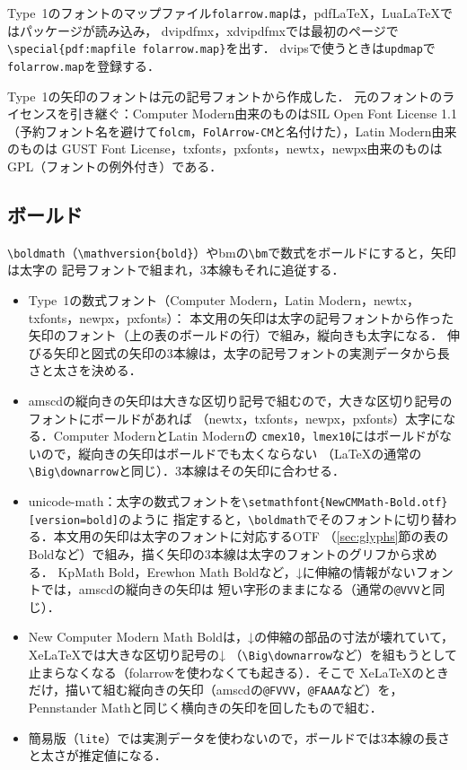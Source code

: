 \documentclass[dvipdfmx,paper=a4]{jlreq}
\newcommand\pkg[1]{\textsf{#1}}
\newcommand\file[1]{\texttt{#1}}
\begin{document}
Type~1のフォントのマップファイル\file{folarrow.map}は，pdf\LaTeX，Lua\LaTeX{}ではパッケージが読み込み，
dvipdfmx，xdvipdfmxでは最初のページで\verb|\special{pdf:mapfile folarrow.map}|を出す．
dvipsで使うときは\file{updmap}で\file{folarrow.map}を登録する．

Type~1の矢印のフォントは元の記号フォントから作成した．
元のフォントのライセンスを引き継ぐ：Computer Modern由来のものはSIL Open Font License 1.1
（予約フォント名を避けて\file{folcm}，\texttt{FolArrow-CM}と名付けた），Latin Modern由来のものは
GUST Font License，\pkg{txfonts}，\pkg{pxfonts}，\pkg{newtx}，\pkg{newpx}由来のものは
GPL（フォントの例外付き）である．

\subsection{ボールド}\label{sec:bold}
\verb|\boldmath|（\verb|\mathversion{bold}|）や\pkg{bm}の\verb|\bm|で数式をボールドにすると，矢印は太字の
記号フォントで組まれ，3本線もそれに追従する．
\begin{itemize}
\item Type~1の数式フォント（Computer Modern，Latin Modern，\pkg{newtx}，\pkg{txfonts}，\pkg{newpx}，\pkg{pxfonts}）：
  本文用の矢印は太字の記号フォントから作った矢印のフォント（上の表のボールドの行）で組み，縦向きも太字になる．
  伸びる矢印と図式の矢印の3本線は，太字の記号フォントの実測データから長さと太さを決める．
\item \pkg{amscd}の縦向きの矢印は大きな区切り記号で組むので，大きな区切り記号のフォントにボールドがあれば
  （\pkg{newtx}，\pkg{txfonts}，\pkg{newpx}，\pkg{pxfonts}）太字になる．Computer ModernとLatin Modernの
  \file{cmex10}，\file{lmex10}にはボールドがないので，縦向きの矢印はボールドでも太くならない
  （\LaTeX{}の通常の\verb|\Big\downarrow|と同じ）．3本線はその矢印に合わせる．
\item \pkg{unicode-math}：太字の数式フォントを\verb|\setmathfont{NewCMMath-Bold.otf}[version=bold]|のように
  指定すると，\verb|\boldmath|でそのフォントに切り替わる．本文用の矢印は太字のフォントに対応するOTF
  （\ref{sec:glyphs}節の表のBoldなど）で組み，描く矢印の3本線は太字のフォントのグリフから求める．
  KpMath Bold，Erewhon Math Boldなど，↓に伸縮の情報がないフォントでは，\pkg{amscd}の縦向きの矢印は
  短い字形のままになる（通常の\verb|@VVV|と同じ）．
\item New Computer Modern Math Boldは，↓の伸縮の部品の寸法が壊れていて，Xe\LaTeX{}では大きな区切り記号の↓
  （\verb|\Big\downarrow|など）を組もうとして止まらなくなる（\pkg{folarrow}を使わなくても起きる）．そこで
  Xe\LaTeX{}のときだけ，描いて組む縦向きの矢印（\pkg{amscd}の\verb|@FVVV|，\verb|@FAAA|など）を，
  Pennstander Mathと同じく横向きの矢印を回したもので組む．
\item 簡易版（\verb|lite|）では実測データを使わないので，ボールドでは3本線の長さと太さが推定値になる．
\end{itemize}
\end{document}
